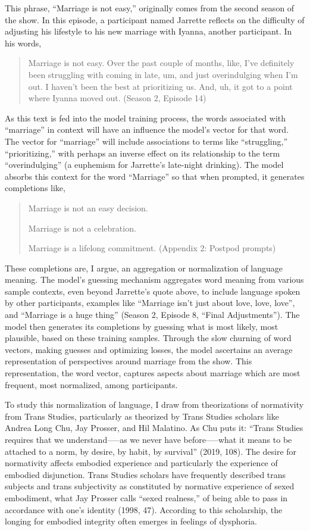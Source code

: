 \documentclass[11pt]{article}
\begin{document}
This phrase, “Marriage is not easy,” originally comes from the second
season of the show. In this episode, a participant named Jarrette
reflects on the difficulty of adjusting his lifestyle to his new
marriage with Iyanna, another participant. In his words,

\begin{quote}
Marriage is not easy. Over the past couple of months, like, I've
definitely been struggling with coming in late, um, and just
overindulging when I'm out. I haven't been the best at prioritizing
us. And, uh, it got to a point where Iyanna moved out. (Season 2,
Episode 14)
\end{quote}

As this text is fed into the model training process, the words
associated with “marriage” in context will have an influence the
model’s vector for that word. The vector for “marriage” will include
associations to terms like “struggling,” “prioritizing,” with perhaps
an inverse effect on its relationship to the term “overindulging” (a
euphemism for Jarrette’s late-night drinking). The model absorbs this
context for the word “Marriage” so that when prompted, it generates
completions like,

\begin{quote}
Marriage is not an easy decision.

Marriage is not a celebration.

Marriage is a lifelong commitment. (Appendix 2: Postpod prompts)
\end{quote}

These completions are, I argue, an aggregation or normalization of
language meaning. The model’s guessing mechanism aggregates word
meaning from various sample contexts, even beyond Jarrette’s quote
above, to include language spoken by other participants, examples like
“Marriage isn’t just about love, love, love”, and “Marriage is a huge
thing” (Season 2, Episode 8, “Final Adjustments”). The model then
generates its completions by guessing what is most likely, most
plausible, based on these training samples. Through the slow churning
of word vectors, making guesses and optimizing losses, the model
ascertains an average representation of perspectives around marriage
from the show. This representation, the word vector, captures aspects
about marriage which are most frequent, most normalized, among
participants.

To study this normalization of language, I draw from theorizations of
normativity from Trans Studies, particularly as theorized by Trans
Studies scholars like Andrea Long Chu, Jay Prosser, and Hil Malatino.
As Chu puts it: “Trans Studies requires that we understand—–as we
never have before—–what it means to be attached to a norm, by desire,
by habit, by survival” (2019, 108). The desire for normativity affects
embodied experience and particularly the experience of embodied
disjunction. Trans Studies scholars have frequently described trans
subjects and trans subjectivity as constituted by normative experience
of sexed embodiment, what Jay Prosser calls “sexed realness,” of being
able to pass in accordance with one’s identity (1998, 47). According
to this scholarship, the longing for embodied integrity often emerges
in feelings of dysphoria.
\end{document}
